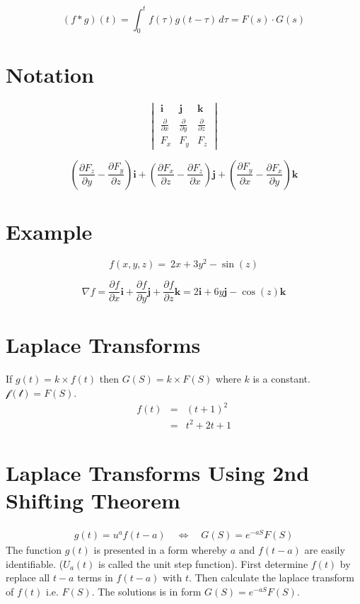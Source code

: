 \documentclass[12pt, a4paper]{article}
\begin{document}
\[ (f * g)(t) = \int_0^t f(\tau)g(t-\tau)\,d\tau= F(s) \cdot G(s) \]


\section{Notation}
\[ \begin{vmatrix} \mathbf{i} & \mathbf{j} & \mathbf{k} \\
{\frac{\partial}{\partial x}} & {\frac{\partial}{\partial y}} & {\frac{\partial}{\partial z}} \\
 F_x & F_y & F_z \end{vmatrix}\]

\[\left(\frac{\partial F_z}{\partial y}  - \frac{\partial F_y}{\partial z}\right) \mathbf{i} + \left(\frac{\partial F_x}{\partial z} - \frac{\partial F_z}{\partial x}\right) \mathbf{j} + \left(\frac{\partial F_y}{\partial x} - \frac{\partial F_x}{\partial y}\right) \mathbf{k}\]

\section{Example}
\[f(x,y,z)= \ 2x+3y^2-\sin(z)\]

\[ \nabla f=
\frac{\partial f}{\partial x} \mathbf{i} +
\frac{\partial f}{\partial y} \mathbf{j} +
\frac{\partial f}{\partial z} \mathbf{k}
 = 2\mathbf{i}+ 6y\mathbf{j} -\cos(z)\mathbf{k}\]


\section{Laplace Transforms }
If $g(t)=k \times f(t)$ then $G(S) = k \times F(S)$ where $k$ is a
constant. $\mathcal{f(t)}=F(S)$.
\begin{eqnarray}
f(t) &=& (t+1)^2\\
&=& t^2 +2t +1 \nonumber
\end{eqnarray}



\section{Laplace Transforms Using 2nd Shifting Theorem}

\begin{eqnarray}
 g(t) = u^{a}f(t-a) \quad \Leftrightarrow \quad G(S)= e^{-aS}F(S) \nonumber
\end{eqnarray}
The function $g(t)$ is presented in a form whereby $a$ and
$f(t-a)$ are easily identifiable. ($U_{a}(t)$ is called the unit
step function). First determine $f(t)$ by replace all $t-a$ terms
in $f(t-a)$ with $t$. Then calculate the laplace transform of
$f(t)$ i.e. $F(S)$. The solutions is in form $G(S)= e^{-aS}F(S)$.
\end{document}
